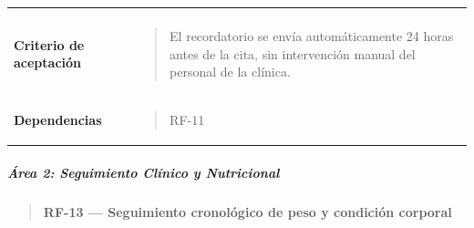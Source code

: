 \documentclass[
]{article}
\begin{document}
{\begin{longtable}[]{@{}
  >{\raggedright\arraybackslash}p{}
  >{\raggedright\arraybackslash}p{}@{}}
\begin{minipage}[t]{\linewidth}
\end{minipage} \\
\textbf{Criterio de aceptación} &
\begin{minipage}[t]{\linewidth}\raggedright
\begin{quote}
El recordatorio se envía automáticamente 24 horas antes de la cita, sin
intervención manual del personal de la clínica.
\end{quote}
\end{minipage} \\
\textbf{Dependencias} & \begin{minipage}[t]{\linewidth}\raggedright
\begin{quote}
RF-11
\end{quote}
\end{minipage} \\
\end{longtable}
}

\subparagraph{Área 2: Seguimiento Clínico y
Nutricional}\label{uxe1rea-2-seguimiento-cluxednico-y-nutricional}

\begin{quote}
\textbf{RF-13 --- Seguimiento cronológico de peso y condición corporal}
\end{quote}
\end{document}
